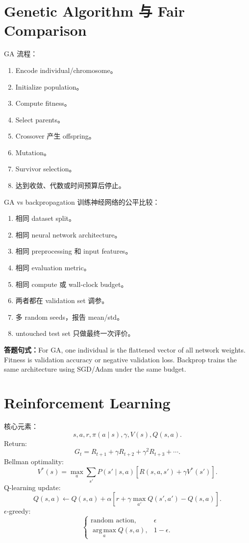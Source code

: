 \documentclass[UTF8,11pt,a4paper]{ctexart}
\newcommand{\ans}[1]{\textbf{答题句式：}#1}
\newcommand{\argmax}{\operatorname*{arg\,max}}
\begin{document}
\section{Genetic Algorithm 与 Fair Comparison}

GA 流程：
\begin{enumerate}
\item Encode individual/chromosome。
\item Initialize population。
\item Compute fitness。
\item Select parents。
\item Crossover 产生 offspring。
\item Mutation。
\item Survivor selection。
\item 达到收敛、代数或时间预算后停止。
\end{enumerate}

GA vs backpropagation 训练神经网络的公平比较：
\begin{enumerate}
\item 相同 dataset split。
\item 相同 neural network architecture。
\item 相同 preprocessing 和 input features。
\item 相同 evaluation metric。
\item 相同 compute 或 wall-clock budget。
\item 两者都在 validation set 调参。
\item 多 random seeds，报告 mean/std。
\item untouched test set 只做最终一次评价。
\end{enumerate}

\ans{For GA, one individual is the flattened vector of all network weights. Fitness is validation accuracy or negative validation loss. Backprop trains the same architecture using SGD/Adam under the same budget.}

\section{Reinforcement Learning}

核心元素：
\[
s,a,r,\pi(a\mid s),\gamma,V(s),Q(s,a).
\]
Return:
\[
G_t=R_{t+1}+\gamma R_{t+2}+\gamma^2R_{t+3}+\cdots.
\]
Bellman optimality:
\[
V^*(s)=\max_a\sum_{s'}P(s'\mid s,a)
\left[R(s,a,s')+\gamma V^*(s')\right].
\]
Q-learning update:
\[
Q(s,a)\leftarrow Q(s,a)+\alpha
\left[r+\gamma\max_{a'}Q(s',a')-Q(s,a)\right].
\]
$\epsilon$-greedy:
\[
\begin{cases}
\text{random action},&\epsilon\\
\argmax_a Q(s,a),&1-\epsilon.
\end{cases}
\]
\end{document}
